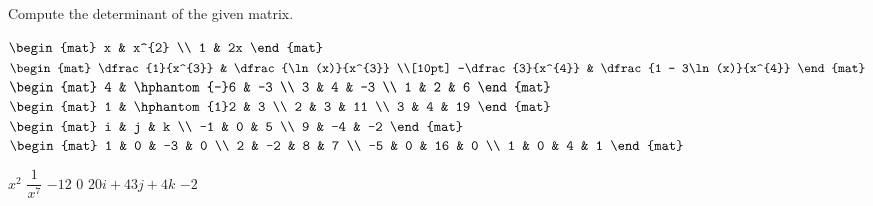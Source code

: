 
\begin{Exercise}[
name={},
title={}, 
difficulty=0,
origin={\cite{GH}}]
Compute the determinant of the given matrix.
\begin{multicols}{2}
\Question $
\begin{mat}
 x & x^{2} \\ 1 & 2x 
\end{mat}$
\Question $
\begin{mat}
 \dfrac{1}{x^{3}} & \dfrac{\ln(x)}{x^{3}} \\[10pt] -\dfrac{3}{x^{4}} & \dfrac{1 - 3\ln(x)}{x^{4}} 
\end{mat}$
\Question $
\begin{mat}
 4 & \hphantom{-}6 & -3 \\ 3 & 4 & -3 \\ 1 & 2 & 6 
\end{mat}$
\Question $
\begin{mat}
1 & \hphantom{1}2 & 3 \\ 2 & 3 & 11 \\ 3 & 4 & 19 
\end{mat}$
\Question $
\begin{mat}
 i & j & k \\ -1 & 0 & 5 \\ 9 & -4 & -2 
\end{mat}$
\Question $
\begin{mat}
 1 & 0 & -3 & 0 \\ 2 & -2 & 8 & 7 \\ -5 & 0 & 16 & 0 \\ 1 & 0 & 4 & 1 
\end{mat}$
\EndCurrentQuestion
\end{multicols}

\end{Exercise}
\begin{Answer}
\Question $x^{2}$
\Question $\dfrac{1}{x^{7}}$
\Question $-12$
\Question $0$
\Question $20i + 43j + 4k$
\Question $-2$
\end{Answer}
